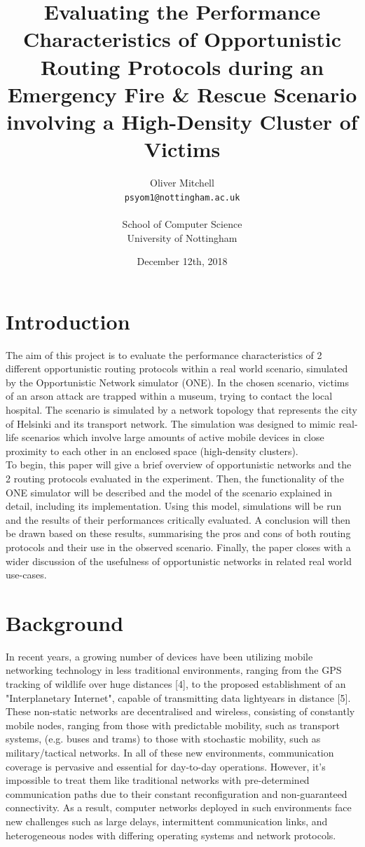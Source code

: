 \documentclass{article}
\title{Evaluating the Performance Characteristics of Opportunistic Routing Protocols during an Emergency Fire \& Rescue Scenario involving a High-Density Cluster of Victims}
\author{
  Oliver Mitchell\\
  \texttt{psyom1@nottingham.ac.uk}\\\\
  \textnormal{School of Computer Science}\\
  \textnormal{University of Nottingham}
}
\date{December 12th, 2018}
\begin{document}
\maketitle
 
\tableofcontents
\newpage

\section{Introduction}
The aim of this project is to evaluate the performance characteristics of 2 different opportunistic routing protocols within a real world scenario, simulated by the Opportunistic Network simulator (ONE). In the chosen scenario, victims of an arson attack are trapped within a museum, trying to contact the local hospital. The scenario is simulated by a network topology that represents the city of Helsinki and its transport network. The simulation was designed to mimic real-life scenarios which involve large amounts of active mobile devices in close proximity to each other in an enclosed space (high-density clusters).\\
\newline
To begin, this paper will give a brief overview of opportunistic networks and the 2 routing protocols evaluated in the experiment. Then, the functionality of the ONE simulator will be described and the model of the scenario explained in detail, including its implementation. Using this model, simulations will be run and the results of their performances critically evaluated. A conclusion will then be drawn based on these results, summarising the pros and cons of both routing protocols and their use in the observed scenario. Finally, the paper closes with a wider discussion of the usefulness of opportunistic networks in related real world use-cases.

\section{Background}
In recent years, a growing number of devices have been utilizing mobile networking technology in less traditional environments, ranging from the GPS tracking of wildlife over huge distances [4], to the proposed establishment of an "Interplanetary Internet", capable of transmitting data lightyears in distance [5]. These non-static networks are decentralised and wireless, consisting of constantly mobile nodes, ranging from those with predictable mobility, such as transport systems, (e.g. buses and trams) to those with stochastic mobility, such as military/tactical networks. In all of these new environments, communication coverage is pervasive and essential for day-to-day operations. However, it's impossible to treat them like traditional networks with pre-determined communication paths due to their constant reconfiguration and non-guaranteed connectivity. As a result, computer networks deployed in such environments face new challenges such as large delays, intermittent communication links, and heterogeneous nodes with differing operating systems and network protocols.
\end{document}
